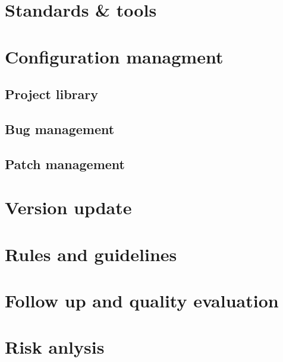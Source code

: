 \documentclass{article}
\begin{document}
    \subsection{}

\section{Standards \& tools}

\section{Configuration managment}

    \subsection{Project library}
    
    \subsection{Bug management}
    
    \subsection{Patch management}

    \section{Version update}

\section{Rules and guidelines}
    
\section{Follow up and quality evaluation}

\section{Risk anlysis}
\end{document}
